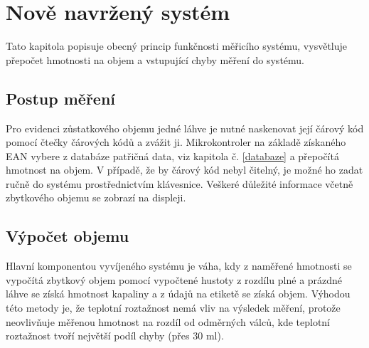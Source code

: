 






\chapter{Nově navržený systém}
Tato kapitola popisuje obecný princip funkčnosti měřicího systému, vysvětluje přepočet hmotnosti na objem a vstupující chyby měření do systému.

\section{Postup měření}

Pro evidenci zůstatkového objemu jedné láhve je nutné naskenovat její čárový kód pomocí čtečky čárových kódů a zvážit ji. Mikrokontroler na základě získaného EAN vybere z databáze patřičná data, viz kapitola č. \ref{databaze} a přepočítá hmotnost na objem. V případě, že by čárový kód nebyl čitelný, je možné ho zadat ručně do systému prostřednictvím klávesnice. Veškeré důležité informace včetně zbytkového objemu se zobrazí na displeji.

\section{Výpočet objemu}
Hlavní komponentou vyvíjeného systému je váha, kdy z naměřené hmotnosti se vypočítá zbytkový objem pomocí vypočtené hustoty z rozdílu plné a prázdné láhve se získá hmotnost kapaliny a z údajů na etiketě se získá objem. Výhodou této metody je, že teplotní roztažnost nemá vliv na výsledek měření, protože neovlivňuje měřenou hmotnost na rozdíl od odměrných válců, kde teplotní roztažnost tvoří největší podíl chyby (přes 30 ml).


